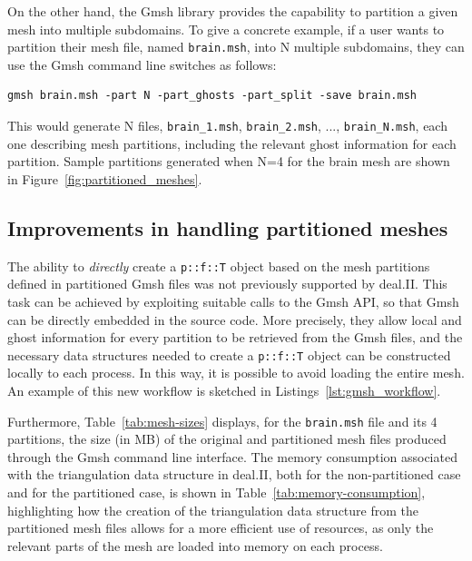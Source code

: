 \documentclass[a4paper,12pt]{article}
\begin{document}
On the other hand, the Gmsh library provides the capability to partition a given mesh
into multiple subdomains. To give a concrete example, if a user
wants to partition their mesh file, named \texttt{brain.msh}, into N multiple subdomains, they can use the Gmsh command line switches as follows:
\begin{lstlisting}[caption=Partitioning a .msh file via command line switches]
gmsh brain.msh -part N -part_ghosts -part_split -save brain.msh
\end{lstlisting}
This would generate N files, \texttt{brain\_1.msh}, \texttt{brain\_2.msh}, ..., \texttt{brain\_{N}.msh}, each one
describing mesh partitions, including the relevant ghost information for each partition. Sample partitions generated
when N=4 for the brain mesh are shown in Figure~\ref{fig:partitioned_meshes}.

\subsection{Improvements in handling partitioned meshes}
The ability to \emph{directly} create a \texttt{p::f::T} object based on the mesh partitions defined in partitioned Gmsh files was not previously supported
by deal.II. This task can be achieved by exploiting suitable calls to the Gmsh API, so that Gmsh can be directly
embedded in the source code. More precisely, they allow local and ghost information for every partition to be retrieved from
the Gmsh files, and the necessary data structures needed to create a \texttt{p::f::T} object can be constructed locally to each process. In
this way, it is possible to avoid loading the entire mesh. An example of this new workflow is
sketched in Listings~\ref{lst:gmsh_workflow}.

Furthermore, Table~\ref{tab:mesh-sizes} displays, for the \texttt{brain.msh} file and its 4 partitions, the size (in MB) of the original and partitioned mesh files produced through the Gmsh command line
interface. The memory consumption associated with the triangulation data structure in deal.II, both for the non-partitioned case and for
the partitioned case, is shown in Table~\ref{tab:memory-consumption}, highlighting how the creation of the triangulation data
structure from the partitioned mesh files allows for a more efficient use of resources, as only the relevant parts of
the mesh are loaded into memory on each process.
\end{document}
